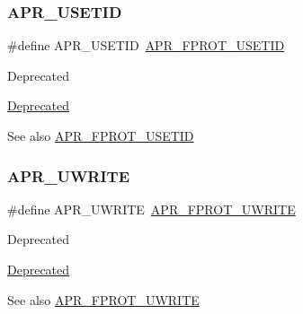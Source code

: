 \subsubsection{\texorpdfstring{A\+P\+R\+\_\+\+U\+S\+E\+T\+ID}{APR\_USETID}}
{\footnotesize\ttfamily \#define A\+P\+R\+\_\+\+U\+S\+E\+T\+ID~\mbox{\hyperlink{group__apr__file__permissions_ga67caebf5bbe4f3f4b6252a75e5ce066f}{A\+P\+R\+\_\+\+F\+P\+R\+O\+T\+\_\+\+U\+S\+E\+T\+ID}}}

\begin{DoxyRefDesc}{Deprecated}
\item[\mbox{\hyperlink{deprecated__deprecated000003}{Deprecated}}]\end{DoxyRefDesc}
\begin{DoxySeeAlso}{See also}
\mbox{\hyperlink{group__apr__file__permissions_ga67caebf5bbe4f3f4b6252a75e5ce066f}{A\+P\+R\+\_\+\+F\+P\+R\+O\+T\+\_\+\+U\+S\+E\+T\+ID}} 
\end{DoxySeeAlso}
\mbox{\label{group__apr__file__permissions_ga4faa7fdfa3bcda569dd1e23ae002c5e5}} 
\subsubsection{\texorpdfstring{A\+P\+R\+\_\+\+U\+W\+R\+I\+TE}{APR\_UWRITE}}
{\footnotesize\ttfamily \#define A\+P\+R\+\_\+\+U\+W\+R\+I\+TE~\mbox{\hyperlink{group__apr__file__permissions_ga50b985779b15fbfdae0758e98ffb92af}{A\+P\+R\+\_\+\+F\+P\+R\+O\+T\+\_\+\+U\+W\+R\+I\+TE}}}

\begin{DoxyRefDesc}{Deprecated}
\item[\mbox{\hyperlink{deprecated__deprecated000005}{Deprecated}}]\end{DoxyRefDesc}
\begin{DoxySeeAlso}{See also}
\mbox{\hyperlink{group__apr__file__permissions_ga50b985779b15fbfdae0758e98ffb92af}{A\+P\+R\+\_\+\+F\+P\+R\+O\+T\+\_\+\+U\+W\+R\+I\+TE}} 
\end{DoxySeeAlso}
\mbox{\label{group__apr__file__permissions_ga7bf4afea195c62f41aad1d3e94dcdac6}} 
